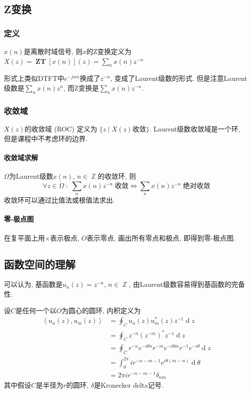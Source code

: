 \documentclass{ctexart}
\DeclareMathOperator{\ZT}{\mathbf{ZT}}
\DeclareMathOperator{\ud}{\mathrm{d}}
\DeclareMathOperator{\Zset}{\mathbb{Z}}
\begin{document}
\subsection{Z变换}
\subsubsection{定义} $x(n)$是离散时域信号,
    则$x$的Z变换定义为$X(z) = \ZT[x(n)](z) = \sum_n x(n) z^{-n}$\par
    形式上类似DTFT中$e^{-jwn}$换成了$z^{-n}$, 变成了Laurent级数的形式.
    但是注意Laurent级数是$\sum_n x (n) z^n$, 而Z变换是$\sum_n x (n) z^{-n}$.
\subsubsection{收敛域} $X(z)$的收敛域 (ROC) 定义为 $\{z \;|\; X(z)\text{收敛}\}$.
    Laurent级数收敛域是一个环, 但是课程中不考虑环的边界.
\paragraph{收敛域求解} $\Omega$为Laurent级数$x(n),\,n\in\Zset$的收敛环, 则
    \[\forall z \in \mathring{\Omega}\;:\;
        \sum_n x(n)z^{-n}\;\text{收敛} \Leftrightarrow
        \sum_n x(n)z^{-n}\;\text{绝对收敛} \]
    收敛环可以通过比值法或根值法求出.
\paragraph{零-极点图}  在复平面上用$\times$表示极点,
    $O$表示零点, 画出所有零点和极点, 即得到零-极点图.
\subsection{函数空间的理解}
    可以认为, 基函数是$u_n(z) = z^{-n},\,n \in \Zset$, 由Laurent级数容易得到基函数的完备性.\par
    设$C$是任何一个以$O$为圆心的圆环, 内积定义为\begin{align*}
        \left\langle u_n(z), u_m(z) \right\rangle &= \oint_C u_n(z) u_m^*(z) z^{-1} \ud z\\
            &= \oint_C z^{-n} (z^{-m})^* z^{-1} \ud z\\
            &= \oint_C r^{-n} e^{-i \theta n} r^{-m} e^{-i \theta m} r^{-1} e^{-i \theta} \ud z\\
            &= \int_0^{2\pi} i r^{-n-m-1} e^{i \theta (m - n)} \ud \theta\\
        &= 2 \pi i r^{-n-m-1} \delta_{nm}\end{align*}
    其中假设$C$是半径为$r$的圆环, $\delta$是Kronecker delta记号.
\end{document}
